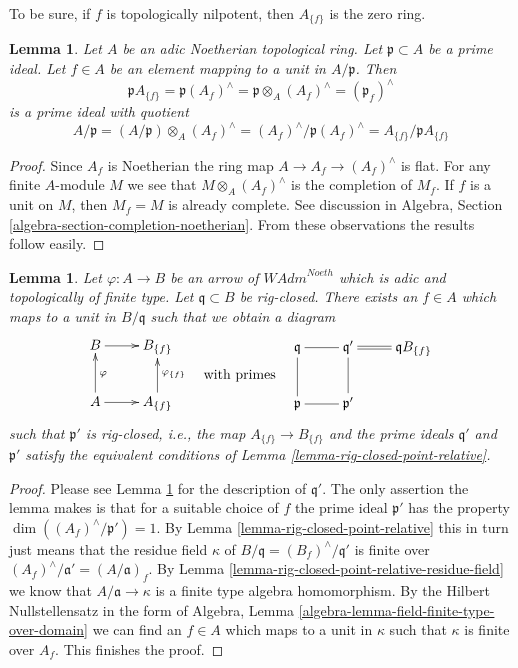 \documentclass{stacks-project}
\theoremstyle{plain}
\newtheorem{lemma}[subsection]{Lemma}
\theoremstyle{definition}
\theoremstyle{remark}
\numberwithin{equation}{subsection}
\begin{document}
\noindent
To be sure, if $f$ is topologically nilpotent, then $A_{\{f\}}$
is the zero ring.

\begin{lemma}
\label{lemma-rig-closed-point-in-localization}
Let $A$ be an adic Noetherian topological ring.
Let $\mathfrak p \subset A$ be a prime ideal.
Let $f \in A$ be an element mapping to a unit in $A/\mathfrak p$.
Then
$$
\mathfrak p A_{\{f\}} =
\mathfrak p(A_f)^\wedge =
\mathfrak p \otimes_A (A_f)^\wedge =
(\mathfrak p_f)^\wedge
$$
is a prime ideal with quotient
$$
A/\mathfrak p = (A/\mathfrak p) \otimes_A (A_f)^\wedge =
(A_f)^\wedge / \mathfrak p (A_f)^\wedge = A_{\{f\}}/\mathfrak p A_{\{f\}}
$$
\end{lemma}

\begin{proof}
Since $A_f$ is Noetherian the ring map $A \to A_f \to (A_f)^\wedge$
is flat. For any finite $A$-module $M$ we see that
$M \otimes_A (A_f)^\wedge$ is the completion of $M_f$.
If $f$ is a unit on $M$, then $M_f = M$ is already complete.
See discussion in Algebra, Section \ref{algebra-section-completion-noetherian}.
From these observations the results follow easily.
\end{proof}

\begin{lemma}
\label{lemma-rig-closed-point-after-localization}
Let $\varphi : A \to B$ be an arrow of $\textit{WAdm}^{Noeth}$
which is adic and topologically of finite type.
Let $\mathfrak q \subset B$ be rig-closed.
There exists an $f \in A$ which maps to a unit in
$B/\mathfrak q$ such that we obtain a diagram
$$
\vcenter{
\xymatrix{
B \ar[r] &
B_{\{f\}} \\
A \ar[r] \ar[u]_\varphi &
A_{\{f\}} \ar[u]_{\varphi_{\{f\}}}
}
}
\quad\text{with primes}\quad
\vcenter{
\xymatrix{
\mathfrak q \ar@{-}[r] \ar@{-}[d] &
\mathfrak q' \ar@{-}[d] \ar@{=}[r] &
\mathfrak q B_{\{f\}} \\
\mathfrak p \ar@{-}[r] &
\mathfrak p'
}
}
$$
such that $\mathfrak p'$ is rig-closed, i.e.,
the map $A_{\{f\}} \to B_{\{f\}}$ and the prime ideals
$\mathfrak q'$ and $\mathfrak p'$ satisfy
the equivalent conditions of Lemma \ref{lemma-rig-closed-point-relative}.
\end{lemma}

\begin{proof}
Please see Lemma \ref{lemma-rig-closed-point-in-localization}
for the description of $\mathfrak q'$. The only assertion the lemma makes
is that for a suitable choice of $f$ the prime ideal $\mathfrak p'$
has the property $\dim((A_f)^\wedge/\mathfrak p') = 1$.
By Lemma \ref{lemma-rig-closed-point-relative} this in turn
just means that the residue field $\kappa$ of
$B/\mathfrak q = (B_f)^\wedge/\mathfrak q'$ is finite over
$(A_f)^\wedge/\mathfrak a' = (A/\mathfrak a)_f$.
By Lemma \ref{lemma-rig-closed-point-relative-residue-field}
we know that $A/\mathfrak a \to \kappa$ is a finite type
algebra homomorphism. By the Hilbert Nullstellensatz in
the form of Algebra, Lemma \ref{algebra-lemma-field-finite-type-over-domain}
we can find an $f \in A$ which maps to a unit in $\kappa$
such that $\kappa$ is finite over $A_f$. This finishes the proof.
\end{proof}
\end{document}
